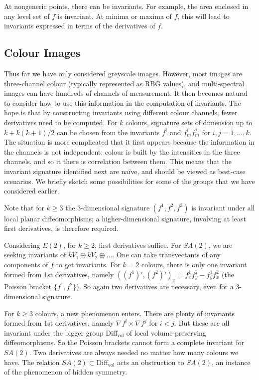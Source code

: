 \documentclass[review,onefignum,onetabnum]{siamonline190516}
\begin{document}
{At nongeneric points, there can be invariants. For example, the area enclosed in any level set of $f$ is invariant. At minima or maxima of $f$, this will lead to invariants expressed in terms of the derivatives of $f$.

\subsection{Colour Images}

Thus far we have only considered greyscale images. However, most images are three-channel colour (typically represented as RBG values), and multi-spectral images can have hundreds of channels of measurement. It then becomes natural to consider how to use this information in the computation of invariants. The hope is that by constructing invariants using different colour channels, fewer derivatives need to be computed. For $k$ colours, signature sets of dimension up to $k + k(k+1)/2$ can be chosen from the invariants $f^i$ and $f^i_m f^j_m$ for $i,j=1,\dots, k$. The situation is more complicated that it first appears because the information in the channels is not independent: colour is built by the intensities in the three channels, and so it there is correlation between them. This means that the invariant signature identified next are na\"ive, and should be viewed as best-case scenarios. We briefly sketch some possibilities for some of the groups that we have considered earlier.

Note that for $k\ge 3$ the 3-dimensional signature $(f^1,f^2,f^3)$ is invariant under all local planar diffeomorphisms; a higher-dimensional signature, involving at least first derivatives, is therefore required.


Considering $E(2)$, for $k\ge 2$, first derivatives suffice. 
For $SA(2)$,  we are seeking invariants of $k V_1 \oplus k V_2 \oplus \dots$. One can take transvectants of any components of $f$ to get invariants. For $k=2$ colours, there is only one  invariant formed from 1st derivatives, namely $((f^1)',(f^2)')_x = f^1_x f^2_y - f^1_y f^2_x$ (the Poisson bracket $\{f^1,f^2\}$). So again two derivatives are necessary, even for a 3-dimensional signature.

For $k\ge 3$ colours, a new phenomenon enters.  There are plenty of invariants formed from 1st derivatives, namely $\nabla f^i \times \nabla f^j$ for $i<j$. But these are all invariant under the bigger group $\mathrm{Diff}_{\mathrm{vol}}$ of local volume-preserving diffeomorphisms. So the Poisson brackets cannot form a complete invariant for $SA(2)$. Two derivatives are always needed no matter how many colours we have. The relation $SA(2)\subset \mathrm{Diff}_{\mathrm{vol}}$ acts an obstruction to $SA(2)$, an instance of the phenomenon of hidden symmetry.

}
\end{document}
